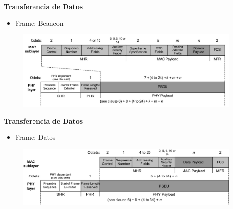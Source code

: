 \documentclass[aspectratio=169]{beamer}
\begin{document}
\begin{frame}{\textbf{Transferencia de Datos}}
\begin{minipage}[c]{1.0\linewidth}
	\begin{minipage}[c]{0.6\linewidth}
		\begin{itemize}
			\item Frame: Beancon
			\vspace{10px}
	  	\end{itemize}	
	\end{minipage}
	\begin{minipage}[c]{0.35\linewidth}
		\begin{figure}[H]
			\includegraphics[width=1\textwidth]{./imagenes/beacon.jpg}
		\end{figure}	  	  	
	\end{minipage}
\end{minipage}
\end{frame}

\begin{frame}{\textbf{Transferencia de Datos}}
\begin{minipage}[c]{1.0\linewidth}
	\begin{minipage}[c]{0.6\linewidth}
		\begin{itemize}
			\item Frame: Datos
			\vspace{10px}
	  	\end{itemize}	
	\end{minipage}
	\begin{minipage}[c]{0.35\linewidth}
		\begin{figure}[H]
			\includegraphics[width=1\textwidth]{./imagenes/data.jpg}
		\end{figure}	  	  	
	\end{minipage}
\end{minipage}
\end{frame}
\end{document}

